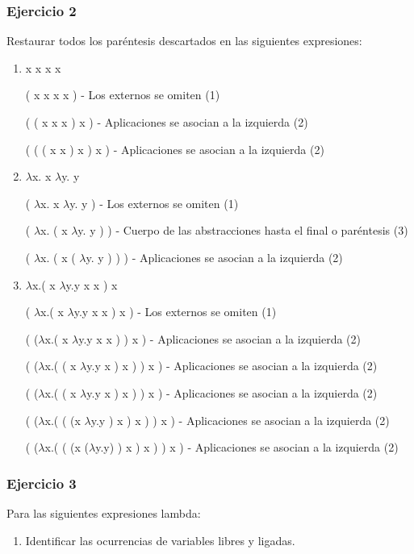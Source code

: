\subsubsection*{Ejercicio 2}
Restaurar todos los paréntesis descartados en las siguientes expresiones:

\begin{enumerate}[label=\alph*)]
\item  x x x x

( x x x x ) - Los externos se omiten (1)

( ( x x x ) x ) - Aplicaciones se asocian a la izquierda (2)

( ( ( x x ) x ) x ) - Aplicaciones se asocian a la izquierda (2)

\item $\lambda$x. x $\lambda$y. y

( $\lambda$x. x $\lambda$y. y ) - Los externos se omiten (1)

( $\lambda$x. ( x $\lambda$y. y ) ) - Cuerpo de las abstracciones hasta el final o paréntesis (3)

( $\lambda$x. ( x ( $\lambda$y. y ) ) ) - Aplicaciones se asocian a la izquierda (2) %

\item $\lambda$x.( x $\lambda$y.y x x ) x

 ( $\lambda$x.( x $\lambda$y.y x x ) x ) - Los externos se omiten (1)

 ( ($\lambda$x.( x $\lambda$y.y x x  ) ) x ) - Aplicaciones se asocian a la izquierda (2)

 ( ($\lambda$x.(  ( x $\lambda$y.y x ) x ) ) x ) - Aplicaciones se asocian a la izquierda (2)

 ( ($\lambda$x.(  ( x $\lambda$y.y x ) x ) ) x ) - Aplicaciones se asocian a la izquierda (2)

 ( ($\lambda$x.(  (  (x $\lambda$y.y ) x ) x ) ) x ) - Aplicaciones se asocian a la izquierda (2)

 ( ($\lambda$x.(  (  (x ($\lambda$y.y) ) x ) x ) ) x ) - Aplicaciones se asocian a la izquierda (2)

\end{enumerate}


\subsubsection*{Ejercicio 3}
Para las siguientes expresiones lambda:

\begin{enumerate}[label=\alph*)]
\item Identificar las ocurrencias de variables libres y ligadas. 
\end{enumerate}

